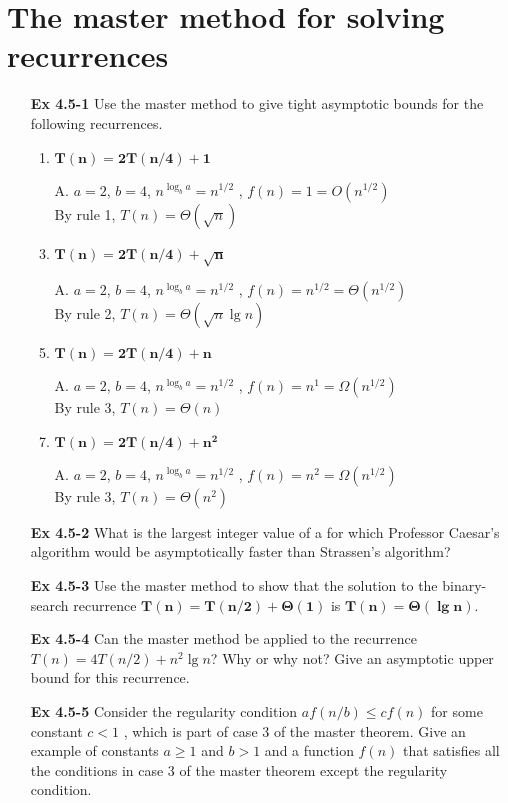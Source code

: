 \documentclass[fontsize=12pt,paper=a4]{book}
\begin{document}
\section{The master method for solving recurrences}
\begin{enumerate}
 \item[\textbf{Ex 4.5-1}]
       Use the master method to give tight asymptotic bounds for the following recurrences.
       \begin{enumerate}
        \item $\mathbf{T(n) = 2T(n/4) + 1}$
        \item[A.]
              $a=2$, $b=4$, $n^{\log_b a}=n^{1/2}$ , $f(n)=1=O(n^{1/2})$ \\
              By rule 1, $T(n) = \Theta(\sqrt{n})$
              
        \item $\mathbf{T(n) = 2T(n/4) + \sqrt{n}}$
        \item[A.]
              $a=2$, $b=4$, $n^{\log_b a}=n^{1/2}$ , $f(n)=n^{1/2}=\Theta(n^{1/2})$\\						By rule 2, $T(n) = \Theta(\sqrt{n} \lg n)$
              
        \item $\mathbf{T(n) = 2T(n/4) + n}$
        \item[A.]
              $a=2$, $b=4$, $n^{\log_b a}=n^{1/2}$ , $f(n)=n^{1}=\Omega(n^{1/2})$\\
              By rule 3, $T(n) = \Theta(n)$
              
        \item $\mathbf{T(n) = 2T(n/4) + n^2}$
        \item[A.]
              $a=2$, $b=4$, $n^{\log_b a}=n^{1/2}$ , $f(n)=n^{2}=\Omega(n^{1/2})$\\
              By rule 3, $T(n) = \Theta(n^2)$
       \end{enumerate}
       
 \item[\textbf{Ex 4.5-2}]
       What is the largest integer value of a for which Professor Caesar’s algorithm would be asymptotically faster than Strassen’s algorithm?
       
 \item[\textbf{Ex 4.5-3}]
       Use the master method to show that the solution to the binary-search recurrence $\mathbf{T(n) = T(n/2)+ \Theta(1)}$ is $\mathbf{T(n)= \Theta(\lg n)}$.
       
 \item[\textbf{Ex 4.5-4}]
       Can the master method be applied to the recurrence $T(n) = 4T(n/2)+n^2 \lg n$? Why or why not? Give an asymptotic upper bound for this recurrence.
       
 \item[\textbf{Ex 4.5-5}]
       Consider the regularity condition $af(n/b) \leq cf(n)$ for some constant $c < 1$ , which is part of case 3 of the master theorem. Give an example of constants $a \geq 1$ and $b > 1$ and a function $f(n)$ that satisfies all the conditions in case 3 of the master theorem except the regularity condition.
       
\end{enumerate}
\end{document}

